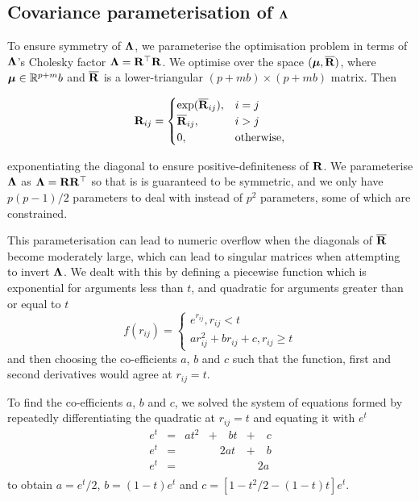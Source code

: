 	\subsection{Covariance parameterisation of ${\boldsymbol \Lambda}$}
	
	To ensure symmetry of ${\boldsymbol \Lambda}$, we parameterise the optimisation problem in terms of ${\boldsymbol \Lambda}$'s
	Cholesky factor  ${\boldsymbol \Lambda} = {\bf R}^\top {\bf R}$. We optimise over the space $({\boldsymbol \mu}, \overline{{\bf R}})$, where ${\boldsymbol \mu}
	\in {\mathbb{R}}^{p + m}b$ and $\overline{{\bf R}}$ is a lower-triangular $(p + mb) \times (p + mb)$ matrix. Then
			
	\begin{equation*}
		{\bf R}_{ij} =
		\begin{cases}
			\exp(\overline{{\bf R}}_{ij}), & i = j             \\
			\overline{{\bf R}}_{ij},       & i > j             \\
			0,                         & \text{otherwise}, 
		\end{cases}
	\end{equation*}
			
	\noindent exponentiating the diagonal to ensure positive-definiteness of ${\bf R}$. We parameterise ${\boldsymbol \Lambda}$
	as ${\boldsymbol \Lambda} = {\bf R} {\bf R}^\top$ so that is is guaranteed to be symmetric, and we only have $p(p-1)/2$ 
	parameters to deal with instead of $p^2$ parameters, some of which are constrained. 
	
	This parameterisation can lead to numeric overflow when the diagonals of $\overline{{\bf R}}$ become moderately
	large, which can lead to singular matrices when attempting to invert ${\boldsymbol \Lambda}$. We dealt with this by
	defining a piecewise function which is exponential for arguments less than $t$, and quadratic for arguments
	greater than or equal to $t$
	$$
	f(r_{ij}) =
	\begin{cases}
		e^{r_{ij}}, r_{ij} < t                   \\
		a r_{ij}^2 + b r_{ij} + c, r_{ij} \geq t 
	\end{cases}
	$$
	and then choosing the co-efficients $a$, $b$ and $c$ such that the function, first and second derivatives would
	agree at $r_{ij} = t$.
	
	To find the co-efficients $a$, $b$ and $c$, we solved the system of equations formed by repeatedly 
	differentiating the quadratic at $r_{ij} =  t$ and equating it with $e^t$
	$$
	\begin{array}{lllll}
		e^t & = & a t^2 & + \quad b t & + \quad c \\
		e^t & = &       & \quad 2a t  & + \quad b \\
		e^t & = &       &             & \quad 2a  \\
	\end{array}
	$$
	to obtain $a = e^t / 2$, $b = (1 - t) e^t$ and $c = [1 - t^2/2 - (1 - t) t] e^t$.
	
